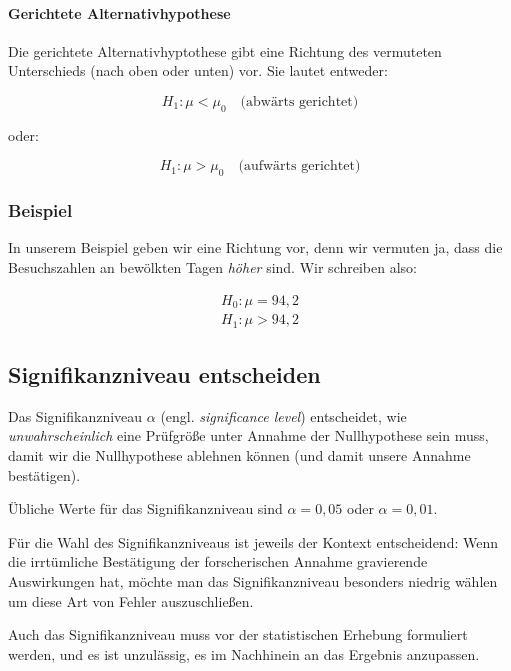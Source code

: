 \documentclass[
  11pt,
  ngerman,
  a4paper,
]{report}
\begin{document}
\hypertarget{gerichtete-alternativhypothese}{%
\paragraph{Gerichtete Alternativhypothese}\label{gerichtete-alternativhypothese}}

Die gerichtete Alternativhyptothese gibt eine Richtung des vermuteten Unterschieds (nach oben oder unten) vor. Sie lautet entweder:

\[
H_1 : \mu < \mu_0 \quad \textrm{(abwärts gerichtet)}
\label{eq:zh1l}
\]

oder:

\[
H_1 : \mu > \mu_0 \quad \textrm{(aufwärts gerichtet)}
\label{eq:zh1g}
\]

\hypertarget{beispiel-1}{%
\subsubsection{Beispiel}\label{beispiel-1}}

In unserem Beispiel geben wir eine Richtung vor, denn wir vermuten ja, dass die Besuchszahlen an bewölkten Tagen \emph{höher} sind. Wir schreiben also:

\[\begin{aligned}
H_0: \mu = 94{,}2\\[4pt]
H_1: \mu>94{,}2
\end{aligned}\]

\hypertarget{signifikanzniveau-entscheiden}{%
\subsection{Signifikanzniveau entscheiden}\label{signifikanzniveau-entscheiden}}

Das Signifikanzniveau \(\alpha\) (engl. \emph{significance level}) entscheidet, wie \emph{unwahrscheinlich} eine Prüfgröße unter Annahme der Nullhypothese sein muss, damit wir die Nullhypothese ablehnen können (und damit unsere Annahme bestätigen).

Übliche Werte für das Signifikanzniveau sind \(\alpha=0{,}05\) oder \(\alpha=0{,}01\).

Für die Wahl des Signifikanzniveaus ist jeweils der Kontext entscheidend: Wenn die irrtümliche Bestätigung der forscherischen Annahme gravierende Auswirkungen hat, möchte man das Signifikanzniveau besonders niedrig wählen um diese Art von Fehler auszuschließen.

Auch das Signifikanzniveau muss vor der statistischen Erhebung formuliert werden, und es ist unzulässig, es im Nachhinein an das Ergebnis anzupassen.
\end{document}
